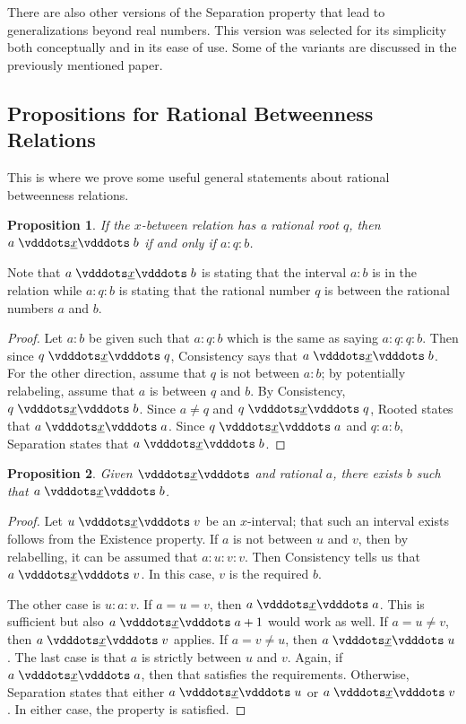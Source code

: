 \documentclass[12pt]{article}
\newtheorem{proposition}{Proposition}[section]
\begin{document}
There are also other versions of the Separation property that lead to generalizations beyond real numbers. This version was selected for its simplicity both conceptually and in its ease of use. Some of the variants are discussed in the previously mentioned paper. 

\subsection{Propositions for Rational Betweenness Relations}

This is where we prove some useful general statements about rational betweenness relations. 

\begin{proposition}\label{br:rooted}
    If the $x$-between relation has a rational root $q$, then $a \xrel b$ if and only if $a : q : b$.
\end{proposition}

Note that $a \xrel b$ is stating that the interval $a:b$ is in the relation while $a:q:b$ is stating that the rational number $q$ is between the rational numbers $a$ and $b$.

\begin{proof}
    Let $a : b$ be given such that $a : q : b$ which is the same as saying $a:q:q:b$. Then since $q \xrel q$, Consistency says that $a \xrel b$. For the other direction, assume that $q$ is not between $a:b$; by potentially relabeling, assume that $a$ is between $q$ and $b$. By Consistency, $q \xrel b$.  Since $a \neq q$ and $q \xrel q$, Rooted states that \sout{$a \xrel a$}. Since $q \xrel a$ and $q:a:b$, Separation states that \sout{$ a \xrel b$}. 
\end{proof}


\begin{proposition}\label{br:existence}
    Given $\xrel$ and rational $a$, there exists $b$ such that $a \xrel b$. 
\end{proposition}

\begin{proof}
    Let $u \xrel v$ be an $x$-interval; that such an interval exists follows from the Existence property. If $a$ is not between $u$ and $v$, then by relabelling, it can be assumed that $a:u:v:v$. Then Consistency tells us that $a \xrel v$. In this case, $v$ is the required $b$. 

    The other case is $u:a:v$. If $a = u = v$, then $a \xrel a$. This is sufficient but also $a \xrel a+1$ would work as well. If $a = u \neq v$, then $a \xrel v$ applies. If $a  = v \neq u$, then $a \xrel u$. The last case is that $a$ is strictly between $u$ and $v$. Again, if $a \xrel a$, then that satisfies the requirements. Otherwise, Separation states that either $a \xrel u$ or $a \xrel v$. In either case, the property is satisfied. 
\end{proof}
\end{document}
